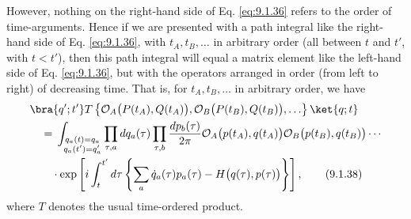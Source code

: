 However, nothing on the right-hand side of Eq. \eqref{eq:9.1.36} refers to the order
of time-arguments. Hence if we are presented with a path integral like the
right-hand side of Eq. \eqref{eq:9.1.36}, with $t_A,t_B,\ldots$ in arbitrary order
(all between $t$ and $t'$, with $t<t'$), then this path integral will equal
a matrix element like the left-hand side of Eq. \eqref{eq:9.1.36}, but with the
operators arranged in order (from left to right) of decreasing time. That is,
for $t_A,t_B,\ldots$ in arbitrary order, we have
\begin{align}
  &\bra{q';t'}T\left\{\mathcal{O}_A\bigl(P(t_A),Q(t_A)\bigr),
  \mathcal{O}_B\bigl(P(t_B),Q(t_B)\bigr),\ldots\right\}\ket{q;t}
  \notag\\
  &\quad={}
  \int_{\substack{q_a(t)=q_a\\q_a(t')=q'_a}}
  \prod_{\tau,a}dq_a(\tau)\prod_{\tau,b}\frac{dp_b(\tau)}{2\pi}
  \mathcal{O}_A\bigl(p(t_A),q(t_A)\bigr)
  \mathcal{O}_B\bigl(p(t_B),q(t_B)\bigr)\cdots
  \notag\\
  &\qquad\cdot\exp\left[i\int_t^{t'}d\tau
  \left\{\sum_a\dot q_a(\tau)p_a(\tau)
  -H\bigl(q(\tau),p(\tau)\bigr)\right\}\right],
  \tag{9.1.38}\label{eq:9.1.38}
\end{align}
where $T$ denotes the usual time-ordered product.

